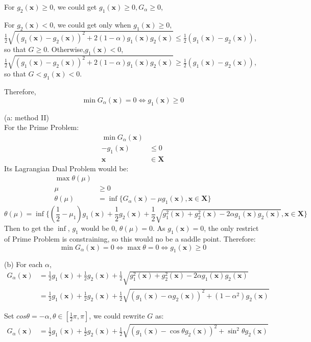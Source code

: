 \documentclass[12pt]{article}
\begin{document}
For  $g_2(\bm x)\ge 0$, we could get $g_1(\bm x)\ge 0, G_{\alpha}\ge0$,

For  $g_2(\bm x)< 0$, we could get only when $g_1(\bm x)\ge 0$,
$\frac{1}{2}\sqrt{ ( g_1(\bm x)- g_2(\bm x) )^2+2(1-\alpha) g_1(\bm x)g_2(\bm x) } 
\le \frac{1}{2} ( g_1(\bm x)- g_2(\bm x) )$, so that $G\ge 0$.
Otherwise,$g_1(\bm x)<0 $,
$\frac{1}{2}\sqrt{ ( g_1(\bm x)- g_2(\bm x) )^2+2(1-\alpha) g_1(\bm x)g_2(\bm x) } 
\ge \frac{1}{2} ( g_1(\bm x)- g_2(\bm x) )$, so that $G< g_1(\bm x)< 0$.

Therefore,
\[
\min G_\alpha(\bm x) =  0\Leftrightarrow g_1(\bm x) \ge 0
\]

(a: method II)\\
For the Prime Problem:
\begin{align*}
    \min G_\alpha(\bm x)&\\
    -g_1 (\bm x)&\leq0\\
    \bm x &\in \bm X
\end{align*}
Its Lagrangian Dual Problem would be:
\begin{align*}
    \max \theta( \mu)&\\
     \mu &\geq  0\\
    \theta(\mu)&=\inf\{
        G_\alpha(\bm x)-\mu g_1(\bm x)
        ,
    \bm x \in \bm X
    \}
\end{align*}
\[
    \theta(\mu)=\inf\{
        (\frac{1}{2}-\mu_1 ) g_1(\bm x) +\frac{1}{2} g_2(\bm x)
        +\frac{1}{2}\sqrt{ g_1^2(\bm x)+ g_2^2(\bm x)-2\alpha g_1(\bm x)g_2(\bm x) }
        , \bm x \in \bm X \}
\]
Then to get the $\inf$, $g_1$ would be 0,
$\theta(\mu )=0$. As $g_1(\bm x)=0$, the only restrict of Prime Problem is constraining, so
this would no be a saddle point. Therefore:
\[
\min G_\alpha(\bm x) = 0 \Leftrightarrow \max\theta = 0\Leftrightarrow g_1(\bm x) \ge 0
\]

(b)
For each $\alpha$, 
\begin{align*}
G_\alpha(\bm x)&=
\frac{1}{2} g_1(\bm x) +\frac{1}{2} g_2(\bm x)
        +\frac{1}{2}\sqrt{ g_1^2(\bm x)+ g_2^2(\bm x)-2\alpha g_1(\bm x)g_2(\bm x) } \\
&=
\frac{1}{2} g_1(\bm x) +\frac{1}{2} g_2(\bm x)
        +\frac{1}{2}\sqrt{ ( g_1(\bm x)-\alpha g_2(\bm x) )^2+(1-\alpha^2)g_2(\bm x) } 
\end{align*}

Set $cos\theta= -\alpha, \theta\in [\frac{1}{2}\pi,\pi]$, we could rewrite $G$ as:
\begin{align*}
G_\alpha(\bm x)&=
\frac{1}{2} g_1(\bm x) +\frac{1}{2} g_2(\bm x)
        +\frac{1}{2}\sqrt{ ( g_1(\bm x)-\cos\theta g_2(\bm x) )^2+\sin^2\theta g_2(\bm x) } 
\end{align*}
\end{document}
